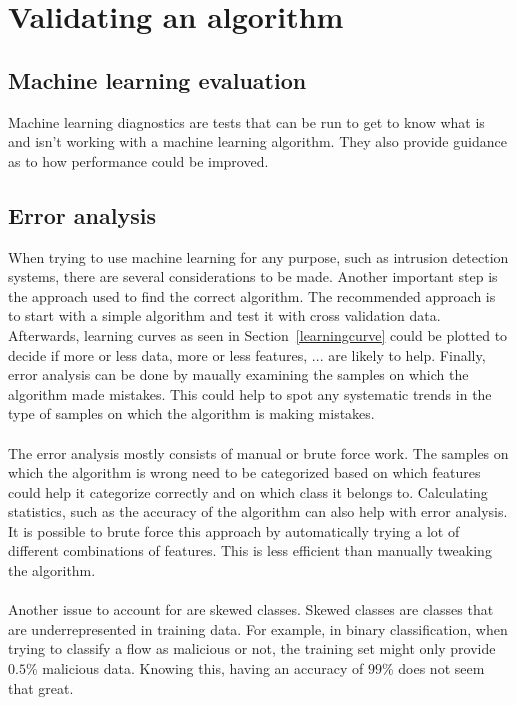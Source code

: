 \chapter{Validating an algorithm}

\section{Machine learning evaluation}
Machine learning diagnostics are tests that can be run to get to know what is and isn't working with a machine learning algorithm. They also provide guidance as to how performance could be improved. 

\section{Error analysis}
\label{errorAnalysis}
When trying to use machine learning for any purpose, such as intrusion detection systems, there are several considerations to be made. Another important step is the approach used to find the correct algorithm. 
The recommended approach is to start with a simple algorithm and test it with cross validation data. Afterwards, learning curves as seen in Section~\ref{learningcurve} could be plotted to decide if more or less data, more or less features, ... are likely to help. Finally, error analysis can be done by maually examining the samples on which the algorithm made mistakes. This could help to spot any systematic trends in the type of samples on which the algorithm is making mistakes.\\\\
The error analysis mostly consists of manual or brute force work. The samples on which the algorithm is wrong need to be categorized based on which features could help it categorize correctly and on which class it belongs to. Calculating statistics, such as the accuracy of the algorithm can also help with error analysis. It is possible to brute force this approach by automatically trying a lot of different combinations of features. This is less efficient than manually tweaking the algorithm.\\\\
Another issue to account for are skewed classes. Skewed classes are classes that are underrepresented in training data. For example, in binary classification, when trying to classify a flow as malicious or not, the training set might only provide $0.5$\% malicious data. Knowing this, having an accuracy of $99$\% does not seem that great.

